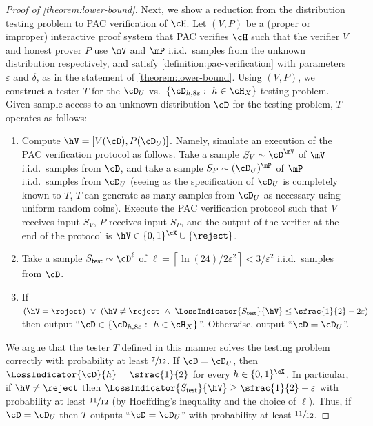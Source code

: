 \documentclass[11pt]{article}
\begin{document}
\begin{proof}[Proof of \cref{theorem:lower-bound}]
	Next, we show a reduction from the distribution testing problem to PAC verification of $\cH$. Let $(V,P)$ be a (proper or improper) interactive proof system that PAC verifies $\cH$ such that the verifier $V$ and honest prover $P$ use $\mV$ and $\mP$ i.i.d.\ samples from the unknown distribution respectively, and satisfy \cref{definition:pac-verification} with parameters $\varepsilon$ and $\delta$, as in the statement of \cref{theorem:lower-bound}.
	Using $(V,P)$, we construct a tester $T$ for the $\cD_U$ vs.\ $\{\cD_{h,8\varepsilon}: ~ h \in \cH_X\}$ testing problem. Given sample access to an unknown distribution $\cD$ for the testing problem, $T$ operates as follows:
	\begin{enumerate}
		\item{
			Compute $\hV = [V(\cD),P(\cD_U)]$. Namely, simulate an execution of the PAC verification protocol as follows. Take a sample $S_V \sim \cD^{\mV}$ of $\mV$ i.i.d.\ samples from $\cD$, and take a sample $S_P \sim (\cD_U)^{\mP}$ of $\mP$ i.i.d.\ samples from $\cD_U$ (seeing as the specification of $\cD_U$ is completely known to $T$, $T$ can generate as many samples from $\cD_U$ as necessary using uniform random coins). Execute the PAC verification protocol such that $V$ receives input $S_V$, $P$ receives input $S_P$, and the output of the verifier at the end of the protocol is $\hV \in \{0,1\}^\cX \cup \{\reject\}$.   
		}
		\item{
			Take a sample $S_{\mathsf{test}} \sim \cD^\ell$ of $\ell = \left\lceil \ln(24)/2\varepsilon^2 \right\rceil < 3/\varepsilon^2$ i.i.d.\ samples from $\cD$.
		}
		\item{
			If $(\hV = \reject)  ~ \lor ~ (\hV \neq \reject ~ \land ~ \LossIndicator{S_{\mathsf{test}}}{\hV} \leq \sfrac{1}{2}-2\varepsilon)$ then output ``$\cD \in \{\cD_{h,8\varepsilon} : ~ h \in \cH_X\}$''. Otherwise, output ``$\cD = \cD_U$''. 
		}
	\end{enumerate}
	We argue that the tester $T$ defined in this manner solves the testing problem correctly with probability at least $\sfrac{7}{12}$. If $\cD = \cD_U$, then $\LossIndicator{\cD}{h} = \sfrac{1}{2}$ for every $h \in \{0,1\}^\cX$. In particular, if $\hV \neq \reject$ then $\LossIndicator{S_{\mathsf{test}}}{\hV} \geq \sfrac{1}{2} - \varepsilon$ with probability at least $\sfrac{11}{12}$ (by Hoeffding's inequality and the choice of $\ell$). Thus, if $\cD = \cD_U$ then $T$ outputs ``$\cD = \cD_U$'' with probability at least $\sfrac{11}{12}$. 
	

\end{proof}
\end{document}
